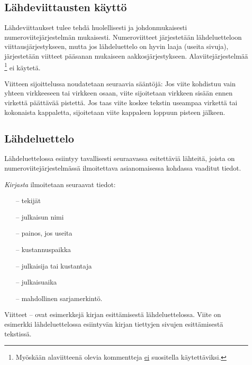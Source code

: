\documentclass[english,12pt,a4paper,pdftex,elec,utf8]{aaltothesis}
\begin{document}
\subsection*{L\"ahdeviittausten k\"aytt\"o}

L\"ahdeviittaukset tulee tehd\"a huolellisesti ja johdonmukaisesti
numeroviitej\"arjestelm\"an mukaisesti. Numeroviitteet j\"arjestet\"a\"an
l\"ahdeluetteloon viittausj\"arjestykseen, mutta jos l\"ahdeluettelo
on hyvin laaja (useita sivuja), j\"arjestet\"a\"an viitteet p\"a\"asanan
mukaiseen aakkosj\"arjestykseen. Alaviitej\"arjestelm\"a\"a
\footnote{My\"osk\"a\"an alaviitteen\"a olevia kommentteja \underline{ei} suositella
k\"aytett\"aviksi.} ei k\"aytet\"a.

Viitteen sijoittelussa noudatetaan seuraavia s\"a\"ant\"oj\"a:
Jos viite kohdistuu vain yhteen virkkeeseen tai virkkeen
osaan, viite \cite{Kauranen} sijoitetaan virkkeen sis\"a\"an ennen virkett\"a
p\"a\"att\"av\"a\"a pistett\"a. Jos taas viite koskee tekstin useampaa
virkett\"a tai kokonaista kappaletta, sijoitetaan viite kappaleen loppuun
pisteen j\"alkeen. \cite{Kauranen}

\subsection*{L\"ahdeluettelo}

L\"ahdeluettelossa esiintyy tavallisesti seuraavassa esitett\"avi\"a
l\"ahteit\"a, joista on numeroviitej\"arjestelm\"ass\"a ilmoitettava
asianomaisessa kohdassa vaaditut tiedot.

\textit{Kirjasta} ilmoitetaan seuraavat tiedot:

\begin{itemize}
\item[--]tekij\"at
\item[--]julkaisun nimi
\item[--]painos, jos useita
\item[--]kustannuspaikka
\item[--]julkaisija tai kustantaja
\item[--]julkaisuaika
\item[--]mahdollinen sarjamerkint\"o.
\end{itemize}

Viitteet \cite{Kauranen}--\cite{Koblitz} ovat esimerkkej\"a kirjan
esitt\"amisest\"a l\"ahdeluettelossa. Viite \cite[s.\ 83--124]{Koblitz} on
esimerkki l\"ahdeluettelossa esiintyv\"an kirjan tiettyjen sivujen
esitt\"amisest\"a tekstiss\"a.
\end{document}
